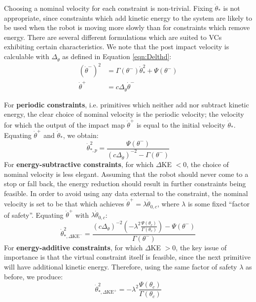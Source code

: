 Choosing a nominal velocity for each constraint is non-trivial. Fixing $\dot{\theta}_*$ is not appropriate, since constraints which add kinetic energy to the system are likely to be used when the robot is moving more slowly than for constraints which remove energy. There are several different formulations which are suited to VCs exhibiting certain characteristics. We note that the post impact velocity is calculable with $\Delta_{\dot{\theta}}$ as defined in Equation \ref{eqn:Delthd}:
\begin{subequations}
	\begin{align}
	\left(\dot{\theta}^-\right)^2 &= \Gamma(\theta^-)\dot{\theta}_*^2 + \Psi(\theta^-) \\
	\dot{\theta}^+ &= c\Delta_{\dot{\theta}}\dot{\theta}^-
	\end{align}
\end{subequations}

For \textbf{periodic constraints}, i.e. primitives which neither add nor subtract kinetic energy, the clear choice of nominal velocity is the periodic velocity; the velocity for which the output of the impact map $\dot{\theta}^+$ is equal to the initial velocity $\dot{\theta}_*$. Equating $\dot{\theta}^+$ and $\dot{\theta}_*$, we obtain:
\begin{equation}
	\dot{\theta}_{*,p}^2 = \frac{\Psi(\theta^-)}{(c\Delta_{\dot{\theta}})^{-2} - \Gamma(\theta^-)}
\end{equation}
For \textbf{energy-subtractive constraints}, for which $\Delta$KE $<0$, the choice of nominal velocity is less elegant. Assuming that the robot should never come to a stop or fall back, the energy reduction should result in further constraints being feasible. In order to avoid using any data external to the constraint, the nominal velocity is set to be that which achieves $\dot{\theta}^+ = \lambda\dot{\theta}_{0,c}$, where $\lambda$ is some fixed ``factor of safety''.
Equating $\dot{\theta}^+$ with $\lambda\dot{\theta}_{0,c}$:
\begin{equation}
	\dot{\theta}_{*,\Delta\mathrm{KE}^-}^2 = \frac{(c\Delta_{\dot{\theta}})^{-2}\left(-\lambda^2\frac{ \Psi(\theta_c)}{ \Gamma(\theta_c)}\right) - \Psi(\theta^-)} {\Gamma(\theta^-)}
\end{equation}
For \textbf{energy-additive constraints}, for which $\Delta$KE $>0$, the key issue of importance is that the virtual constraint itself is feasible, since the next primitive will have additional kinetic energy. Therefore, using the same factor of safety $\lambda$ as before, we produce:
\begin{equation}
	\dot{\theta}_{*,\Delta\mathrm{KE}^+}^2 = -\lambda^2\frac{ \Psi(\theta_c)}{ \Gamma(\theta_c)}
\end{equation}

